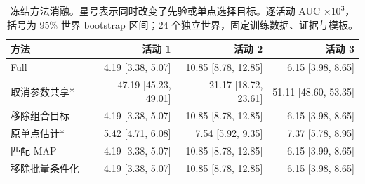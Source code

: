 \begin{table}[tbp]
\centering
\caption{冻结方法消融。星号表示同时改变了先验或单点选择目标。逐活动 AUC $\times10^3$，括号为 95\% 世界 bootstrap 区间；24 个独立世界，固定训练数据、证据与模板。}
\label{tab:ablations}
\scriptsize
\setlength{\tabcolsep}{3pt}
\begin{tabular}{lrrr}
\toprule
方法 & 活动 1 & 活动 2 & 活动 3 \\
\midrule
Full & 4.19 [3.38, 5.07] & 10.85 [8.78, 12.85] & 6.15 [3.98, 8.65] \\
取消参数共享* & 47.19 [45.23, 49.01] & 21.17 [18.72, 23.61] & 51.11 [48.60, 53.35] \\
移除组合目标 & 4.19 [3.38, 5.07] & 10.85 [8.78, 12.85] & 6.15 [3.98, 8.65] \\
原单点估计* & 5.42 [4.71, 6.08] & 7.54 [5.92, 9.35] & 7.37 [5.78, 8.95] \\
匹配 MAP & 4.19 [3.38, 5.07] & 10.85 [8.78, 12.85] & 6.15 [3.99, 8.65] \\
移除批量条件化 & 4.19 [3.38, 5.07] & 10.85 [8.78, 12.85] & 6.15 [3.98, 8.65] \\
\bottomrule
\end{tabular}
\end{table}
